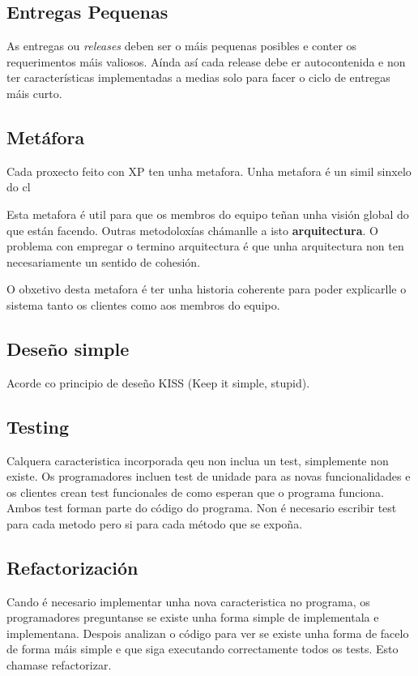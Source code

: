 \subsection{Entregas Pequenas}
As entregas ou \emph{releases} deben ser o máis pequenas posibles e conter os requerimentos máis valiosos. Aínda así cada release debe er autocontenida e non ter características implementadas a medias solo para facer o ciclo de entregas máis curto.

\subsection{Metáfora}
Cada proxecto feito con XP ten unha metafora. Unha metafora é un simil sinxelo do cl

Esta metafora é util para que os membros do equipo teñan unha visión global do que están facendo. Outras metodoloxías chámanlle a isto \textbf{arquitectura}. O problema con empregar o termino arquitectura é que unha arquitectura non ten necesariamente un sentido de cohesión.

O obxetivo desta metafora é ter unha historia coherente para poder explicarlle o sistema tanto os clientes como aos membros do equipo.

\subsection{Deseño simple}
Acorde co principio de deseño KISS (Keep it simple, stupid).

\subsection{Testing}
Calquera caracteristica incorporada qeu non inclua un test, simplemente non existe. Os programadores incluen test de unidade para as novas funcionalidades e os clientes crean test funcionales de como esperan que o programa funciona. Ambos test forman parte do código do programa. Non é necesario escribir test para cada metodo pero si para cada método que se expoña.

\subsection{Refactorización}
Cando é necesario implementar unha nova caracteristica no programa, os programadores preguntanse se existe unha forma simple de implementala e implementana. Despois analizan o código para ver se existe unha forma de facelo de forma máis simple e que siga executando correctamente todos os tests. Esto chamase refactorizar.

